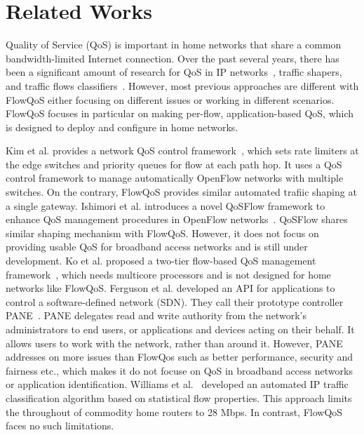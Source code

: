 \section{Related Works}
\label{sec:related-works}

Quality of Service (QoS) is important in home networks that share a common bandwidth-limited Internet connection. Over the past several years, there has been a significant amount of research for QoS in IP networks~\cite{aurrecoechea1998survey, mcdysan1999qos, newman1996ipsilon}, traffic shapers\cite{Meraki}, and traffic flows classifiers~\cite{roughan2004class}. However, most previous approaches are different with FlowQoS either focusing on different issues or working in different scenarios. FlowQoS focuses in particular on making per-flow, application-based QoS, which is designed to deploy and configure in home networks.

Kim et al. provides a network QoS control framework~\cite{kim2010automated}, which sets rate limiters at the edge switches and priority queues for flow at each path hop. It uses a QoS control framework to manage automatically OpenFlow networks with multiple switches. On the contrary, FlowQoS provides similar automated trafiic shaping at a single gateway. Ishimori et al. introduces a novel QoSFlow framework to enhance QoS management procedures in OpenFlow networks~\cite{ishimori2012automatic}. QoSFlow shares similar shaping mechanism with FlowQoS. However, it does not focus on providing usable QoS for broadband access networks and is still under development. 
Ko et al. proposed a two-tier flow-based QoS management framework~\cite{nam2013openqflow}, which needs multicore processors and is not designed for home networks like FlowQoS. Ferguson et al. developed an API for applications to control a software-defined network (SDN). They call their prototype controller PANE~\cite{ferguson2013participatory}. PANE delegates read and write authority from the network’s administrators to end users, or applications and devices acting on their behalf. It allows users to work with the network, rather than around it. However, PANE addresses on more issues than FlowQos such as better performance, security and fairness etc., which makes it do not focuse on QoS in broadband access networks or application identification. Williams et al.~\cite{williams2011real} developed an automated IP traffic classification algorithm based on statistical flow properties. This approach limits the throughout of commodity home routers to 28 Mbps. In contrast, FlowQoS faces no such limitations.

